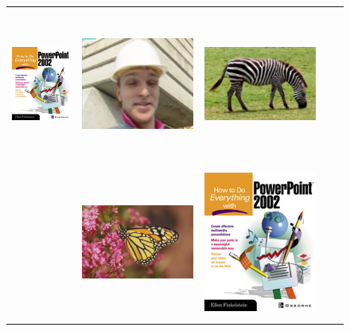\documentclass[10pt,twocolumn,letterpaper]{article}
\begin{document}
\begin{figure}[]
{\begin{tabular}{ccccc}
\includegraphics[height=5cm]{RGB4x/ppt34-ANR.png}&
\includegraphics[height=5cm]{RGB4x/foreman4-ANR.png}&
\includegraphics[height=5cm]{RGB4x/zebra4-ANR.png}\\[4pt]
\parbox[b]{3mm}{}&
\includegraphics[height=5cm]{RGB4x/monarch6-A+.png}&
\includegraphics[height=5cm]{RGB4x/ppt36-A+.png}&

\end{tabular}}
\end{figure}
\end{document}
